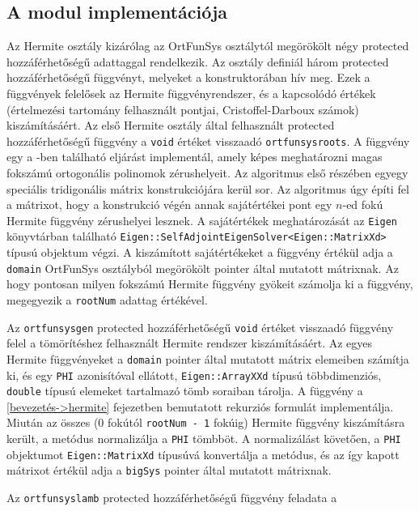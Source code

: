 \documentclass[oneside,titlepage,12pt,a4paper]{report}
\begin{document}
\subsection*{A modul implementációja}

\par Az Hermite osztály kizárólag az OrtFunSys osztálytól megörökölt négy protected hozzáférhetőségű adattaggal rendelkezik. 
Az osztály definiál három protected hozzáférhetőségű függvényt, melyeket a konstruktorában hív meg. Ezek a függvények felelősek az Hermite függvényrendszer, és a kapcsolódó értékek (értelmezési tartomány felhasznált pontjai, Cristoffel-Darboux számok) kiszámításáért. 
Az első Hermite osztály által felhasznált protected hozzáférhetőségű függvény a \texttt{void} értéket visszaadó \texttt{ortfunsysroots}.
A függvény egy a \cite{Gautschi}-ben található eljárást implementál, amely képes meghatározni magas fokszámú ortogonális polinomok zérushelyeit. Az algoritmus első részében egyegy speciális tridigonális mátrix konstrukciójára kerül sor. Az algoritmus úgy építi fel a mátrixot, hogy a konstrukció végén annak sajátértékei pont egy $n$-ed fokú Hermite függvény zérushelyei lesznek. A sajátértékek meghatározását az \texttt{Eigen} könyvtárban található \texttt{Eigen::SelfAdjointEigenSolver<Eigen::MatrixXd>} típusú objektum végzi. A kiszámított sajátértékeket a függvény értékül adja a \texttt{domain} OrtFunSys osztályból megörökölt pointer által mutatott mátrixnak. Az hogy pontosan milyen fokszámú Hermite függvény gyökeit számolja ki a függvény, megegyezik a \texttt{rootNum} adattag értékével.   
\par Az \texttt{ortfunsysgen} protected hozzáférhetőségű \texttt{void} értéket visszaadó függvény felel a tömörítéshez felhasznált Hermite rendszer kiszámításáért. Az egyes Hermite függvényeket a \texttt{domain} pointer által mutatott mátrix elemeiben számítja ki, és egy \texttt{PHI} azonisítóval ellátott, \texttt{Eigen::ArrayXXd} típusú többdimenziós, \texttt{double} típusú elemeket tartalmazó tömb soraiban tárolja. A függvény a \ref{bevezetés->hermite} fejezetben bemutatott rekurziós formulát implementálja. Miután az összes (0 fokútól \texttt{rootNum - 1} fokúig) Hermite függvény kiszámításra került, a metódus normalizálja a \texttt{PHI} tömbböt. A normalizálást követően, a \texttt{PHI} objektumot \texttt{Eigen::MatrixXd} típusúvá konvertálja a metódus, és az így kapott mátrixot értékül adja a \texttt{bigSys} pointer által mutatott mátrixnak.
\par Az \texttt{ortfunsyslamb} protected hozzáférhetőségű függvény feladata a
\end{document}
